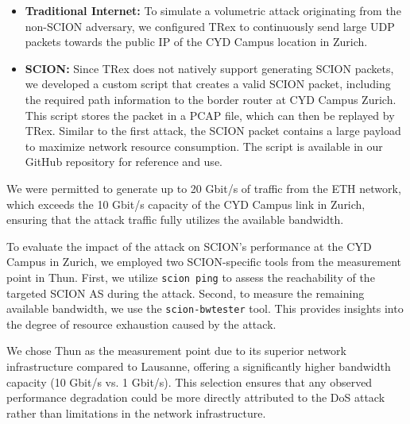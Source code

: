 \begin{itemize}
    \item \textbf{Traditional Internet:}
    To simulate a volumetric attack originating from the non-SCION adversary, we configured TRex to continuously send large UDP packets towards the public IP of the CYD Campus location in Zurich.
    \item \textbf{SCION:} Since TRex does not natively support generating SCION packets, we developed a custom script that creates a valid SCION packet, including the required path information to the border router at CYD Campus Zurich.
    This script stores the packet in a PCAP file, which can then be replayed by TRex.
    Similar to the first attack, the SCION packet contains a large payload to maximize network resource consumption.
    The script is available in our GitHub repository \cite{gitHubMseewerMasterThesis} for reference and use.
\end{itemize}

We were permitted to generate up to 20 Gbit/s of traffic from the ETH network, which exceeds the 10 Gbit/s capacity of the CYD Campus link in Zurich, ensuring that the attack traffic fully utilizes the available bandwidth.

To evaluate the impact of the attack on SCION's performance at the CYD Campus in Zurich, we employed two SCION-specific tools from the measurement point in Thun.
First, we utilize \texttt{scion ping} to assess the reachability of the targeted SCION AS during the attack.
Second, to measure the remaining available bandwidth, we use the \texttt{scion-bwtester} tool.
This provides insights into the degree of resource exhaustion caused by the attack.

We chose Thun as the measurement point due to its superior network infrastructure compared to Lausanne, offering a significantly higher bandwidth capacity (10 Gbit/s vs. 1 Gbit/s).
This selection ensures that any observed performance degradation could be more directly attributed to the DoS attack rather than limitations in the network infrastructure.